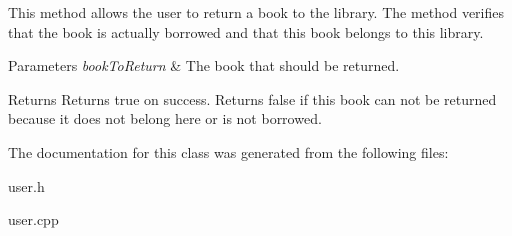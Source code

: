 This method allows the user to return a book to the library. The method verifies that the book is actually borrowed and that this book belongs to this library.


\begin{DoxyParams}{Parameters}
{\em book\+To\+Return} & The book that should be returned. \\
\hline
\end{DoxyParams}
\begin{DoxyReturn}{Returns}
Returns true on success. Returns false if this book can not be returned because it does not belong here or is not borrowed. 
\end{DoxyReturn}


The documentation for this class was generated from the following files\+:\begin{DoxyCompactItemize}
\item 
user.\+h\item 
user.\+cpp\end{DoxyCompactItemize}

